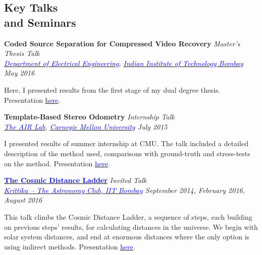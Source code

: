 \documentclass[margin,line]{res}
\newenvironment{list1}{
  \begin{list}{\ding{113}}{%
      \setlength{\itemsep}{0in}
      \setlength{\parsep}{0in} \setlength{\parskip}{0in}
      \setlength{\topsep}{0in} \setlength{\partopsep}{0in} 
      \setlength{\leftmargin}{0.17in}}}{\end{list}}
\begin{document}
\begin{resume}
\section{\sc Key Talks \\ and Seminars}
{\bf Coded Source Separation for Compressed Video Recovery} \hfill {\em Master's Thesis Talk} \\
{\em \href{http://www.ee.iitb.ac.in/}{\textcolor{blue}{Department of Electrical Engineering}}, \href{http://www.iitb.ac.in/}{\textcolor{blue}{Indian Institute of Technology Bombay}} \hfill May 2016} \\
\vspace*{-.15in}
\begin{list1}
\item[] Here, I presented results from the first stage of my dual degree thesis. Presentation \href{http://alankarkotwal.github.io/sre.pptx}{\textcolor{blue} {here}}.
\end{list1}

\vspace*{-0.1in}

{\bf Template-Based Stereo Odometry} \hfill {\em Internship Talk} \\
{\em \href{http://theairlab.org/}{\textcolor{blue}{The AIR Lab}}, \href{http://www.cmu.edu/}{\textcolor{blue}{Carnegie Mellon University}} \hfill July 2015} \\
\vspace*{-.15in}
\begin{list1}
\item[] I presented results of summer internship at CMU. The talk included a detailed description of the method used, comparisons with ground-truth and stress-tests on the method. Presentation \href{http://alankarkotwal.github.io/intern_presentation.pptx}{\textcolor{blue} {here}}.
\end{list1}

\vspace*{-0.1in}

{\bf \href{http://www.stab-iitb.org/krittika/the-cosmic-ladder-distance}{\textcolor{blue} {The Cosmic Distance Ladder}}} \hfill {\em Invited Talk} \\
{\em \href{http://www.stab-iitb.org/krittika/}{\textcolor{blue} {Krittika -- The Astronomy Club, IIT Bombay}} \hfill September 2014, February 2016, August 2016} \\
\vspace*{-.15in}
\begin{list1}
\item[] This talk climbs the Cosmic Distance Ladder, a sequence of steps, each building on previous steps' results, for calculating distances in the universe. We begin with solar system distances, and end at enormous distances where the only option is using indirect methods. Presentation \href{http://alankarkotwal.github.io/CosmicDistanceLadder.pptx}{\textcolor{blue} {here}}.
\end{list1}


\end{resume}
\end{document}
